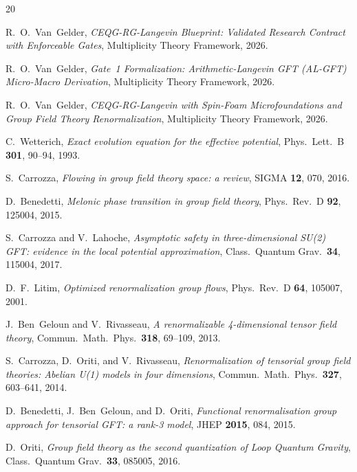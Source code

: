 \documentclass[11pt,a4paper]{article}
\theoremstyle{definition}
\theoremstyle{plain}
\theoremstyle{remark}
\begin{document}
\begin{thebibliography}{20}

R.~O.~Van~Gelder,
\textit{CEQG-RG-Langevin Blueprint: Validated Research Contract with
Enforceable Gates}, Multiplicity Theory Framework, 2026.

R.~O.~Van~Gelder,
\textit{Gate~1 Formalization: Arithmetic-Langevin GFT (AL-GFT)
Micro-Macro Derivation}, Multiplicity Theory Framework, 2026.

R.~O.~Van~Gelder,
\textit{CEQG-RG-Langevin with Spin-Foam Microfoundations and
Group Field Theory Renormalization}, Multiplicity Theory Framework,
2026.

C.~Wetterich,
\textit{Exact evolution equation for the effective potential},
Phys.\ Lett.\ B \textbf{301}, 90--94, 1993.

S.~Carrozza,
\textit{Flowing in group field theory space: a review},
SIGMA \textbf{12}, 070, 2016.

D.~Benedetti,
\textit{Melonic phase transition in group field theory},
Phys.\ Rev.\ D \textbf{92}, 125004, 2015.

S.~Carrozza and V.~Lahoche,
\textit{Asymptotic safety in three-dimensional SU(2) GFT:
evidence in the local potential approximation},
Class.\ Quantum Grav.\ \textbf{34}, 115004, 2017.

D.~F.~Litim,
\textit{Optimized renormalization group flows},
Phys.\ Rev.\ D \textbf{64}, 105007, 2001.

J.~Ben~Geloun and V.~Rivasseau,
\textit{A renormalizable 4-dimensional tensor field theory},
Commun.\ Math.\ Phys.\ \textbf{318}, 69--109, 2013.

S.~Carrozza, D.~Oriti, and V.~Rivasseau,
\textit{Renormalization of tensorial group field theories:
Abelian U(1) models in four dimensions},
Commun.\ Math.\ Phys.\ \textbf{327}, 603--641, 2014.

D.~Benedetti, J.~Ben~Geloun, and D.~Oriti,
\textit{Functional renormalisation group approach for tensorial GFT:
a rank-3 model},
JHEP \textbf{2015}, 084, 2015.

D.~Oriti,
\textit{Group field theory as the second quantization of Loop Quantum
Gravity},
Class.\ Quantum Grav.\ \textbf{33}, 085005, 2016.

\end{thebibliography}
\end{document}
